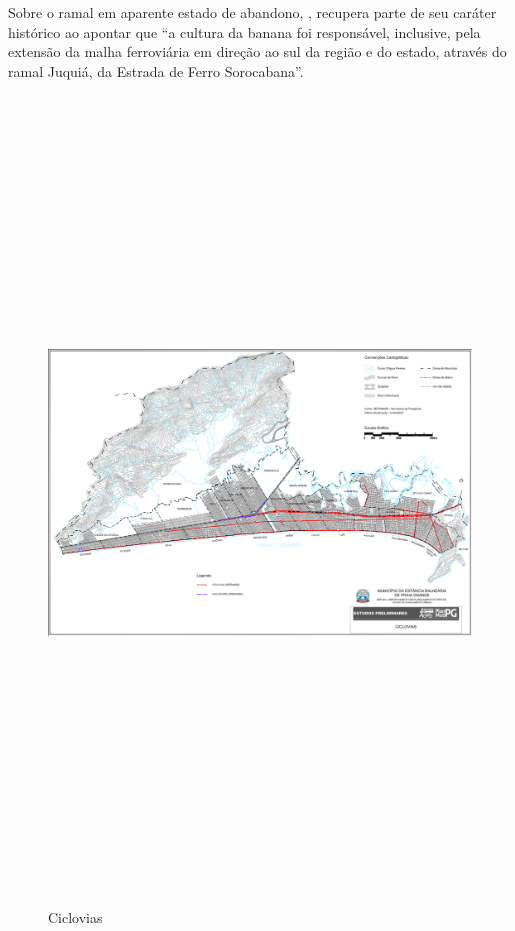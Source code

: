 	Sobre o ramal em aparente estado de abandono, \cite[p.321]{Zundt2006a}, recupera parte de seu caráter histórico ao apontar que ``a cultura da banana foi responsável, inclusive, pela extensão da malha ferroviária em direção ao sul da região e do estado, através do ramal Juquiá, da Estrada de Ferro Sorocabana''.

	\begin{landscape}
		\begin{figure}[p]
			\centering
			\caption{Ciclovias}
			\includegraphics[width=21cm,height=21cm,keepaspectratio]{img/Ciclovias.png}
			\label{mapa_ciclovias}
		\end{figure}
	\end{landscape}
		
